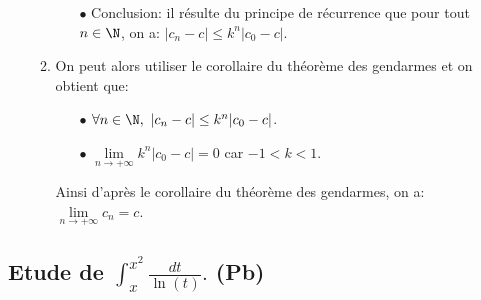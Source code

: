 \begin{correction}
\begin{enumerate}
\begin{enumerate}
\begin{itemize}
\item[$\bullet$] Conclusion: il r\'esulte du principe de r\'ecurrence que pour tout $n\in\N$, on a: $|c_n-c|\leq k^n |c_0-c|$.
\end{itemize}
\item On peut alors utiliser le corollaire du th\'eor\`{e}me des gendarmes et on obtient que:
\begin{itemize}
\item[$\bullet$] $\forall n\in\N,\ |c_n-c|\leq k^n |c_0-c|$.
\item[$\bullet$] $\lim\limits_{n\to +\infty} k^n|c_0-c|=0$ car $-1<k<1$.
\end{itemize}
Ainsi d'apr\`{e}s le corollaire du th\'eor\`{e}me des gendarmes, on a: $\lim\limits_{n\to +\infty} c_n=c$.
\end{enumerate}
\end{enumerate}
\end{correction}










\subsection{Etude de $\int_x^{x^2} \frac{dt}{\ln(t)}.$ (Pb) }

